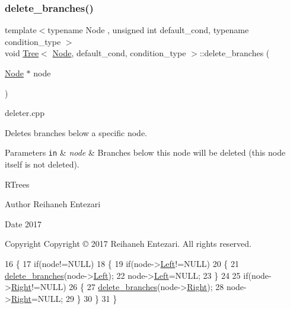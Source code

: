 \subsubsection{\texorpdfstring{delete\+\_\+branches()}{delete\_branches()}}
{\footnotesize\ttfamily template$<$typename Node , unsigned int default\+\_\+cond, typename condition\+\_\+type $>$ \\
void \hyperlink{class_tree}{Tree}$<$ \hyperlink{struct_node}{Node}, default\+\_\+cond, condition\+\_\+type $>$\+::delete\+\_\+branches (\begin{DoxyParamCaption}\item[{\hyperlink{struct_node}{Node} $\ast$}]{node }\end{DoxyParamCaption})}



deleter.\+cpp 

Deletes branches below a specific node. 
\begin{DoxyParams}[1]{Parameters}
\mbox{\tt in}  & {\em node} & Branches below this node will be deleted (this node itself is not deleted).\\
\hline
\end{DoxyParams}
R\+Trees \begin{DoxyAuthor}{Author}
Reihaneh Entezari 
\end{DoxyAuthor}
\begin{DoxyDate}{Date}
2017 
\end{DoxyDate}
\begin{DoxyCopyright}{Copyright}
Copyright © 2017 Reihaneh Entezari. All rights reserved. 
\end{DoxyCopyright}

\begin{DoxyCode}
16 \{
17     \textcolor{keywordflow}{if}(node!=NULL)
18     \{
19         \textcolor{keywordflow}{if}(node->\hyperlink{struct_node_a779292dace788d33114830cca763ccf3}{Left}!=NULL)
20         \{
21             \hyperlink{class_tree_ae78f42d798cdd24b3d5b24621b939468}{delete\_branches}(node->\hyperlink{struct_node_a779292dace788d33114830cca763ccf3}{Left});
22             node->\hyperlink{struct_node_a779292dace788d33114830cca763ccf3}{Left}=NULL;
23         \}
24         
25         \textcolor{keywordflow}{if}(node->\hyperlink{struct_node_ae5ad7032e0a9a52f5a849e33e23a7dfa}{Right}!=NULL)
26         \{
27             \hyperlink{class_tree_ae78f42d798cdd24b3d5b24621b939468}{delete\_branches}(node->\hyperlink{struct_node_ae5ad7032e0a9a52f5a849e33e23a7dfa}{Right});
28             node->\hyperlink{struct_node_ae5ad7032e0a9a52f5a849e33e23a7dfa}{Right}=NULL;
29         \}
30     \}
31 \}
\end{DoxyCode}
\mbox{\label{class_tree_a7ad01e2d8b572e6d1f97e0031214117a}} 
